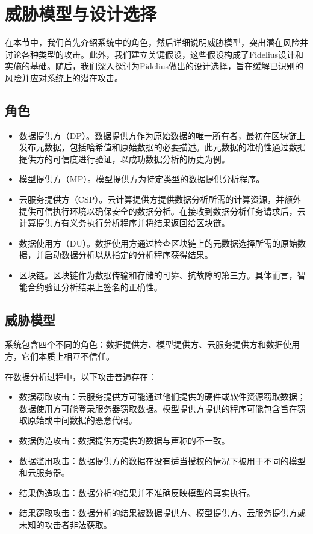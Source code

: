 \section{威胁模型与设计选择}

在本节中，我们首先介绍系统中的角色，然后详细说明威胁模型，突出潜在风险并讨论各种类型的攻击。此外，我们建立关键假设，这些假设构成了Fidelius设计和实施的基础。随后，我们深入探讨为Fidelius做出的设计选择，旨在缓解已识别的风险并应对系统上的潜在攻击。

\subsection{角色}
\begin{itemize}
    \item 数据提供方（DP）。数据提供方作为原始数据的唯一所有者，最初在区块链上发布元数据，包括哈希值和原始数据的必要描述。此元数据的准确性通过数据提供方的可信度进行验证，以成功数据分析的历史为例。
    \item 模型提供方（MP）。模型提供方为特定类型的数据提供分析程序。
    \item 云服务提供方（CSP）。云计算提供方提供数据分析所需的计算资源，并额外提供可信执行环境以确保安全的数据分析。在接收到数据分析任务请求后，云计算提供方有义务执行分析程序并将结果返回给区块链。
    \item 数据使用方（DU）。数据使用方通过检查区块链上的元数据选择所需的原始数据，并启动数据分析以从指定的分析程序获得结果。
    \item 区块链。区块链作为数据传输和存储的可靠、抗故障的第三方。具体而言，智能合约验证分析结果上签名的正确性。
\end{itemize}

\subsection{威胁模型}\label{subsec:threatmodel}

系统包含四个不同的角色：数据提供方、模型提供方、云服务提供方和数据使用方，它们本质上相互不信任。

在数据分析过程中，以下攻击普遍存在：
\begin{itemize}
    \item 数据窃取攻击：云服务提供方可能通过他们提供的硬件或软件资源窃取数据；数据使用方可能登录服务器窃取数据。模型提供方提供的程序可能包含旨在窃取原始或中间数据的恶意代码。
    \item 数据伪造攻击：数据提供方提供的数据与声称的不一致。
    \item 数据滥用攻击：数据提供方的数据在没有适当授权的情况下被用于不同的模型和云服务器。
    \item 结果伪造攻击：数据分析的结果并不准确反映模型的真实执行。
    \item 结果窃取攻击：数据分析的结果被数据提供方、模型提供方、云服务提供方或未知的攻击者非法获取。
\end{itemize}

